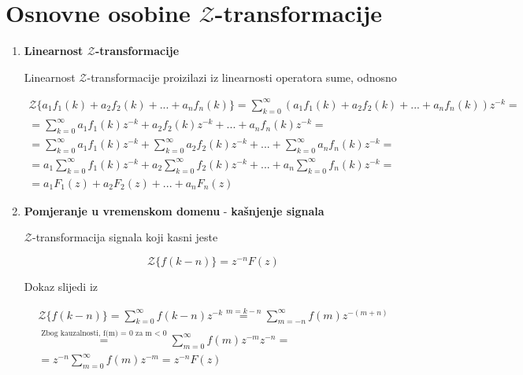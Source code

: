 \documentclass[12pt]{IEEEtran}
\numberwithin{equation}{subsection}
\numberwithin{figure}{section}
\begin{document}
\newpage
\section{\textbf{Osnovne osobine $\mathcal{Z}$-transformacije}}

\begin{enumerate}
    \item \textbf{Linearnost $\mathcal{Z}$-transformacije}

    Linearnost $\mathcal{Z}$-transformacije proizilazi iz 
    linearnosti operatora sume, odnosno 

    \begin{equation}
        \begin{gathered}
            \mathcal{Z}\{a_{1}f_{1}(k) + a_{2}f_{2}(k) + ... + a_{n}f_{n}(k)\} = \sum_{k = 0}^{\infty}{(a_{1}f_{1}(k) + a_{2}f_{2}(k) + ... + a_{n}f_{n}(k))z^{-k}} =\\
            = \sum_{k = 0}^{\infty}{a_{1}f_{1}(k)z^{-k} + a_{2}f_{2}(k)z^{-k} + ... + a_{n}f_{n}(k)z^{-k}} =\\
            = \sum_{k = 0}^{\infty}{a_{1}f_{1}(k)z^{-k}} + \sum_{k = 0}^{\infty}{a_{2}f_{2}(k)z^{-k}} + ... + \sum_{k = 0}^{\infty}{a_{n}f_{n}(k)z^{-k}} =\\
            = a_{1}\sum_{k = 0}^{\infty}{f_{1}(k)z^{-k}} + a_{2}\sum_{k = 0}^{\infty}{f_{2}(k)z^{-k}} + ... + a_{n}\sum_{k = 0}^{\infty}{f_{n}(k)z^{-k}} =\\
            = a_{1}F_{1}(z) + a_{2}F_{2}(z) + ... + a_{n}F_{n}(z)
        \end{gathered}
    \end{equation}
    
    \item \textbf{Pomjeranje u vremenskom domenu} - \textbf{ka\v{s}njenje signala}
    
    $\mathcal{Z}$-transformacija signala koji kasni jeste

    \begin{equation}
        \mathcal{Z}\{f(k - n)\} = z^{-n}F(z)
    \end{equation}

    Dokaz slijedi iz 

    \begin{equation}
        \begin{gathered}
            \mathcal{Z}\{f(k - n)\} = \sum_{k = 0}^{\infty}{f(k - n)z^{-k}} \stackrel{m = k - n}{=} \sum_{m = -n}^{\infty}{f(m)z^{-(m+n)}}\\
            \stackrel{\text{Zbog kauzalnosti, f(m) = 0 za m < 0}}{=} \sum_{m = 0}^{\infty}{f(m)z^{-m}z^{-n}} =\\
            = z^{-n}\sum_{m = 0}^{\infty}{f(m)z^{-m}} = z^{-n}F(z)
        \end{gathered}
    \end{equation}


\end{enumerate}
\end{document}
